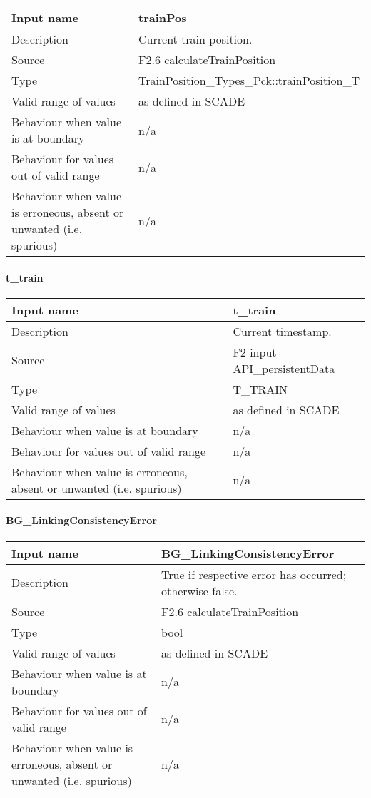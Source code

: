 \begin{longtable}{p{}p{}}
\toprule
Input name				& trainPos \\
\midrule
Description				& Current train position. \\
\midrule
Source					& F2.6 calculateTrainPosition \\ 
\midrule
Type					& TrainPosition\_Types\_Pck::trainPosition\_T \\
\midrule
Valid range of values	& as defined in SCADE \\
\midrule
Behaviour when value is at boundary	& n/a \\
\midrule
Behaviour for values out of valid range	& n/a \\
\midrule
Behaviour when value is erroneous, absent or unwanted (i.e. spurious) & n/a \\
\bottomrule
\end{longtable}

\paragraph{t\_train}

\begin{longtable}{p{}p{}}
\toprule
Input name				& t\_train \\
\midrule
Description				& Current timestamp. \\
\midrule
Source					& F2 input API\_persistentData \\ 
\midrule
Type					& T\_TRAIN \\
\midrule
Valid range of values	& as defined in SCADE \\
\midrule
Behaviour when value is at boundary	& n/a \\
\midrule
Behaviour for values out of valid range	& n/a \\
\midrule
Behaviour when value is erroneous, absent or unwanted (i.e. spurious) & n/a \\
\bottomrule
\end{longtable}

\paragraph{BG\_LinkingConsistencyError}

\begin{longtable}{p{}p{}}
\toprule
Input name				& BG\_LinkingConsistencyError \\
\midrule
Description				& True if respective error has occurred; otherwise false. \\
\midrule
Source					& F2.6 calculateTrainPosition \\ 
\midrule
Type					& bool \\
\midrule
Valid range of values	& as defined in SCADE \\
\midrule
Behaviour when value is at boundary	& n/a \\
\midrule
Behaviour for values out of valid range	& n/a \\
\midrule
Behaviour when value is erroneous, absent or unwanted (i.e. spurious) & n/a \\
\bottomrule
\end{longtable}

